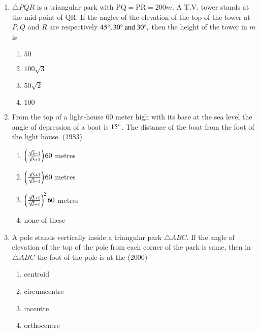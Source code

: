 \begin{enumerate}[label=\thesubsection.\arabic*,ref=\thesubsection.\theenumi]
\begin{multicols}{4}
\begin{enumerate}
        \item $\frac{1}{4}$ 
        \item $\frac{2}{9}$
\end{enumerate}
\end{multicols} 
%
\item $\triangle{PQR}$ is a triangular park with $\text{PQ}=\text{PR}=200m$. A T.V. tower stands at the mid-point of QR. If the angles of the elevation of the top of the tower at ${P,Q \text{ and } R}$ are respectively $45\degree , 30\degree \text{ and } 30\degree,$ then the height of the tower in $m$ is \hfill{}
\begin{multicols}{4}
\begin{enumerate}
        \item $50$                    
        \item $100\sqrt{3}$ 
        \item $50\sqrt{2}$ 
        \item $100$
\end{enumerate}
\end{multicols} 
    \item From the top of a light-house $60 $ meter high with its base at the sea level the angle of depression of a boat is  $15\degree$. The distance of the boat from the foot of the light house.
		 \hfill (1983)
	    \begin{multicols}{2}    
\begin{enumerate}
    \item $\left(\frac{\sqrt{3}-1}{\sqrt{3}+1}\right)60 $ metres 
    \item $\left(\frac{\sqrt{3}+1}{\sqrt{3}-1}\right)60 $ metres 
    \item $\left(\frac{\sqrt{3}+1}{\sqrt{3}-1}\right)^2 60 $ metres 
    \item none of these 
\end{enumerate}
	    \end{multicols}
\item A pole stands vertically inside a triangular park $\triangle ABC$. If the angle of elevation of the top of the pole from each corner of the park is same, then in $\triangle ABC$ the foot of the pole is at the
\hfill (2000)
	    \begin{multicols}{2}    
\begin{enumerate}
\item centroid
\item circumcentre
\item incentre
\item orthocentre

\end{enumerate}
\end{multicols}
\end{enumerate}
